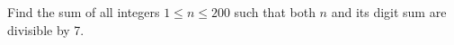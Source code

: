 Find the sum of all integers $1\le n\le200$ such that both $n$ and its digit sum are divisible by 7.
